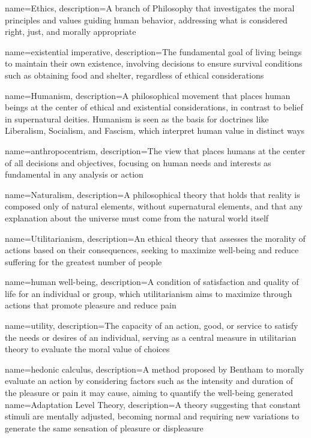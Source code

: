 {
	name=Ethics,
	description={A branch of Philosophy that investigates the moral principles and values guiding human behavior, addressing what is considered right, just, and morally appropriate}
}

{
	name=existential imperative,
	description={The fundamental goal of living beings to maintain their own existence, involving decisions to ensure survival conditions such as obtaining food and shelter, regardless of ethical considerations}
}

{
	name=Humanism,
	description={A philosophical movement that places human beings at the center of ethical and existential considerations, in contrast to belief in supernatural deities. Humanism is seen as the basis for doctrines like Liberalism, Socialism, and Fascism, which interpret human value in distinct ways}
}

{
	name=anthropocentrism,
	description={The view that places humans at the center of all decisions and objectives, focusing on human needs and interests as fundamental in any analysis or action}
}

{
	name=Naturalism,
	description={A philosophical theory that holds that reality is composed only of natural elements, without supernatural elements, and that any explanation about the universe must come from the natural world itself}
}

{
	name=Utilitarianism,
	description={An ethical theory that assesses the morality of actions based on their consequences, seeking to maximize well-being and reduce suffering for the greatest number of people}
}

{
	name=human well-being,
	description={A condition of satisfaction and quality of life for an individual or group, which utilitarianism aims to maximize through actions that promote pleasure and reduce pain}
}

{
	name=utility,
	description={The capacity of an action, good, or service to satisfy the needs or desires of an individual, serving as a central measure in utilitarian theory to evaluate the moral value of choices}
}

{
	name=hedonic calculus,
	description={A method proposed by Bentham to morally evaluate an action by considering factors such as the intensity and duration of the pleasure or pain it may cause, aiming to quantify the well-being generated}
}
{
	name=Adaptation Level Theory,
	description={A theory suggesting that constant stimuli are mentally adjusted, becoming normal and requiring new variations to generate the same sensation of pleasure or displeasure}
}

